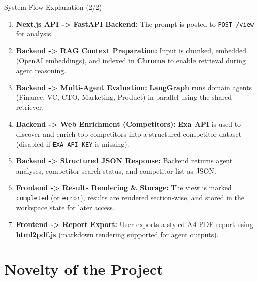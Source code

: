 \documentclass{beamer}
\begin{document}
\begin{frame}{System Flow Explanation (2/2)}
\small
\setcounter{enumi}{5}
\begin{enumerate}
    \item \textbf{Next.js API -> FastAPI Backend:}
    The prompt is posted to \texttt{POST /view} for analysis.

    \item \textbf{Backend -> RAG Context Preparation:}
    Input is chunked, embedded (OpenAI embeddings), and indexed in \textbf{Chroma} to enable retrieval during agent reasoning.

    \item \textbf{Backend -> Multi-Agent Evaluation:}
    \textbf{LangGraph} runs domain agents (Finance, VC, CTO, Marketing, Product) in parallel using the shared retriever.

    \item \textbf{Backend -> Web Enrichment (Competitors):}
    \textbf{Exa API} is used to discover and enrich top competitors into a structured competitor dataset (disabled if \texttt{EXA\_API\_KEY} is missing).

    \item \textbf{Backend -> Structured JSON Response:}
    Backend returns agent analyses, competitor search status, and competitor list as JSON.

    \item \textbf{Frontend -> Results Rendering \& Storage:}
    The view is marked \texttt{completed} (or \texttt{error}), results are rendered section-wise, and stored in the workspace state for later access.

    \item \textbf{Frontend -> Report Export:}
    User exports a styled A4 PDF report using \textbf{html2pdf.js} (markdown rendering supported for agent outputs).
\end{enumerate}
\end{frame}

\section{Novelty of the Project}
\end{document}
